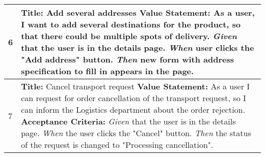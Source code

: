 \documentclass[a4paper]{article}
\begin{document}
\begin{longtable}[c]{|p{0.5cm}||p{}|}
                           \\
               \hline
             6 & 
                 \textbf{Title:} Add several addresses  \newline
                 \textbf{Value Statement:} As a user, I want to add several destinations for the product, so that there could be multiple spots of delivery.  \newline
                 \emph{Given} that the user is in the details page. \newline 
                 \emph{When} user clicks the "Add address" button.  \newline
                 \emph{Then} new form with address specification to fill in appears in the page.
                           \\
               \hline
              7 & 
                 \textbf{Title:}  Cancel transport request   \newline
                 \textbf{Value Statement:}  As a user I can request for order cancellation of the transport request, so I can inform the Logistics department about the order rejection. \newline
                \textbf{Acceptance Criteria:} \newline
                 \emph{Given} that the user is in the details page.\newline 
                 \emph{When} the user clicks the "Cancel" button.\newline
                 \emph{Then} the status of the request is changed to "Processing cancellation". 
                \\
            \hline
          

\end{longtable}
\end{document}
